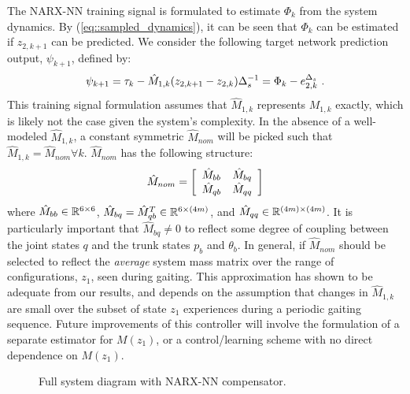 The  NARX-NN training signal is formulated to estimate $\Phi_{k}$ from the system dynamics. By (\ref{eq::sampled_dynamics}), it can be seen that $\Phi_{k}$ can be estimated if ${z}_{2,k+1}$ can be predicted. We consider the following target network prediction output, $\psi_{k+1}$,  defined by:
	\vspace{-2mm}
	\begin{equation}
		\vspace{-1.5mm}
		\psi_{k+1} = \tau_{k} - \hat{M}_{1,k}({z}_{2,k+1} - {z}_{2,k})\Delta_{s}^{-1} = \Phi_{k} - {e}_{2,k}^{\Delta_{s}} \text{ .}
		\label{eq::training_signal}
	\end{equation}
This training signal formulation assumes that $\hat{M}_{1,k}$ represents $M_{1,k}$ exactly, which is likely not the case given the system's complexity. In the absence of a well-modeled $\hat{M}_{1,k}$, a constant symmetric $\hat{M}_{nom}$  will be picked such that $\hat{M}_{1,k} = \hat{M}_{nom} \forall k$. $\hat{M}_{nom}$ has the following structure:
	\begin{equation}
		\vspace{-1.5mm}
		\hat{M}_{nom} = \left[
			\begin{array}{cc}
			\hat{M}_{bb}	&	 \hat{M}_{bq}\\
			\hat{M}_{qb}	&	 \hat{M}_{qq}
			\end{array}
		\right]
	\end{equation}
where 	$\hat{M}_{bb}\in \mathbb{R}^{6\times6}$, 
		$\hat{M}_{bq}=\hat{M}_{qb}^{T} \in \mathbb{R}^{6\times(4m)}$, and  
		$\hat{M}_{qq}\in \mathbb{R}^{(4m)\times(4m)}$. 
It is particularly important that $\hat{M}_{bq}\neq0$ to reflect some degree of coupling between the joint states $q$ and the trunk states $p_{b}$ and $\theta_{b}$. In general, if $\hat{M}_{nom}$ should be selected to reflect the \emph{average} system mass matrix over the range of configurations, $z_{1}$, seen during gaiting. This approximation has shown to be adequate from our results, and depends on the assumption that changes in $\hat{M}_{1,k}$ are small  over the subset of state $z_{1}$ experiences during a periodic gaiting sequence. Future improvements of this controller will involve the formulation of a separate estimator for $M(z_{1})$, or a control/learning scheme with no direct dependence on $M(z_{1})$.
	\begin{figure}[t!]
		\centering
		\caption{Full system diagram with NARX-NN compensator.}
		\label{fig::sys_diagram}
		\vspace{-7mm}
	\end{figure}


